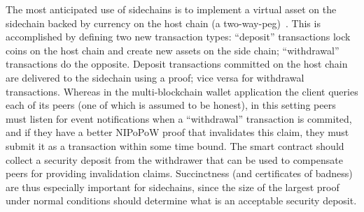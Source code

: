 The most anticipated use of sidechains is to implement a virtual asset on the
sidechain backed by currency on the host chain (a two-way-peg)~\cite{sidechains}. This is accomplished by defining two new transaction
types: ``deposit'' transactions lock coins on the host chain and create new
assets on the side chain; ``withdrawal'' transactions do the opposite. Deposit
transactions committed on the host chain are delivered to the sidechain using a
proof; vice versa for withdrawal transactions. Whereas in the multi-blockchain
wallet application the client queries each of its peers (one of which is assumed
to be honest), in this setting peers must listen for event notifications when a
``withdrawal'' transaction is commited, and if they have a better NIPoPoW proof
that invalidates this claim, they must submit it as a transaction within some
time bound. The smart contract should collect a security deposit from the
withdrawer that can be used to compensate peers for providing invalidation
claims. Succinctness (and certificates of badness) are thus especially important
for sidechains, since the size of the largest proof under normal conditions
should determine what is an acceptable security deposit.
